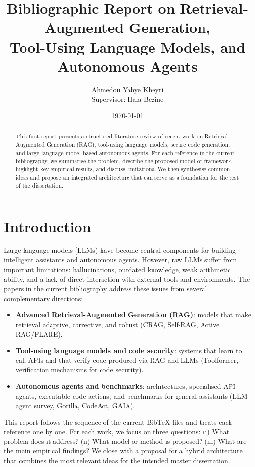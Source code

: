 \documentclass[11pt,a4paper]{article}
\title{Bibliographic Report on Retrieval-Augmented Generation,\\Tool-Using Language Models, and Autonomous Agents}
\author{Ahmedou Yahye Kheyri\\Supervisor: Hala Bezine}
\date{\today}
\begin{document}
\maketitle

\begin{abstract}
This first report presents a structured literature review of recent work on Retrieval-Augmented Generation (RAG), tool-using language models, secure code generation, and large-language-model-based autonomous agents. For each reference in the current bibliography, we summarise the problem, describe the proposed model or framework, highlight key empirical results, and discuss limitations. We then synthesise common ideas and propose an integrated architecture that can serve as a foundation for the rest of the dissertation.
\end{abstract}

\section{Introduction}

Large language models (LLMs) have become central components for building intelligent assistants and autonomous agents. However, raw LLMs suffer from important limitations: hallucinations, outdated knowledge, weak arithmetic ability, and a lack of direct interaction with external tools and environments. The papers in the current bibliography address these issues from several complementary directions:
\begin{itemize}[leftmargin=1.2cm]
  \item \textbf{Advanced Retrieval-Augmented Generation (RAG)}: models that make retrieval adaptive, corrective, and robust (CRAG, Self-RAG, Active RAG/FLARE).
  \item \textbf{Tool-using language models and code security}: systems that learn to call APIs and that verify code produced via RAG and LLMs (Toolformer, verification mechanisms for code security).
  \item \textbf{Autonomous agents and benchmarks}: architectures, specialised API agents, executable code actions, and benchmarks for general assistants (LLM-agent survey, Gorilla, CodeAct, GAIA).
\end{itemize}

This report follows the sequence of the current Bib\TeX{} files and treats each reference one by one. For each work, we focus on three questions: (i) What problem does it address? (ii) What model or method is proposed? (iii) What are the main empirical findings? We close with a proposal for a hybrid architecture that combines the most relevant ideas for the intended master dissertation.
\end{document}
